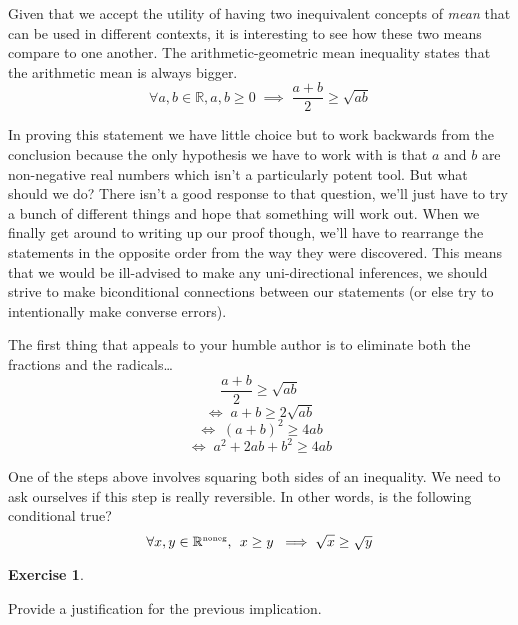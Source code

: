 \documentclass[10pt,]{book}
\theoremstyle{plain}
\theoremstyle{definition}
\theoremstyle{definition}
\newtheorem{exercise}[theorem]{Exercise}
\numberwithin{equation}{section}
\newcommand{\Rnoneg}{{\mathbb R}^{\mbox{\tiny noneg}}}
\newcommand{\Reals}{{\mathbb R}}
\begin{document}
    Given that we accept the utility of having two inequivalent concepts
    of \emph{mean} that can be used in different contexts, it is interesting
    to see how these two means compare to one another. The
    arithmetic-geometric mean inequality states that the arithmetic mean
    is always bigger.
    \begin{equation*}
      \forall a,b \in \Reals,   a,b \geq 0 \; \implies \;  \frac{a+b}{2} \geq \sqrt{ab}
    \end{equation*}
\par

    In proving this statement we have little choice but to work backwards
    from the conclusion because the only hypothesis we have to work with
    is that \(a\) and \(b\) are non-negative real numbers \textemdash{} which isn't a
    particularly potent tool. But what should we do?
    There isn't a good response to that
    question, we'll just have to try a bunch of different things and hope
    that something will work out. When we finally get around to writing up
    our proof though, we'll have to rearrange the statements in the opposite
    order from the way they were discovered. This means that we would
    be ill-advised to make any uni-directional inferences, we should
    strive to make biconditional connections between our statements
    (or else try to intentionally make converse errors).
\par

    The first thing that appeals to your humble author is to eliminate
    both the fractions and the radicals\dots{}
    \begin{equation*}
      \frac{a+b}{2} \geq \sqrt{ab}
    \end{equation*}
    \begin{equation*}
      \iff \; a+b \geq 2\sqrt{ab}
    \end{equation*}
    \begin{equation*}
      \iff \; (a+b)^2 \geq 4ab
    \end{equation*}
    \begin{equation*}
      \iff \; a^2+2ab+b^2 \geq 4ab
    \end{equation*}
\par

    One of the steps above involves squaring both sides of an inequality.
    We need to ask ourselves if this step is really reversible. In other
    words, is the following conditional true?
    \begin{equation*}
      \forall x,y \in \Rnoneg, \, \; 
      x \geq y \; \implies \sqrt{x} \geq \sqrt{y}
    \end{equation*}
\begin{exercise}\label{exercise-18}

        Provide a justification for the previous implication.
\end{exercise}
\par
\end{document}
